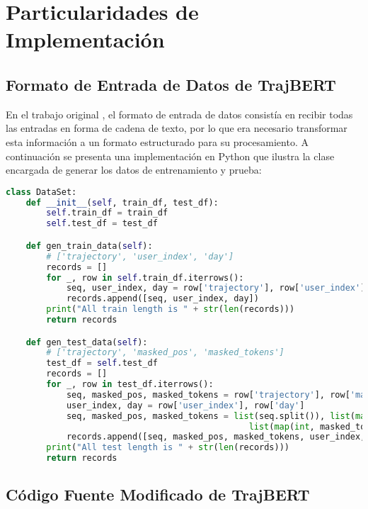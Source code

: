 \appendix

\chapter{Particularidades de Implementación}

\section{Formato de Entrada de Datos de TrajBERT}
\label{apx:trajbert_data_format}

En el trabajo original \cite{si2023trajbert}, el formato de entrada de datos consistía en recibir todas las entradas en forma de cadena de texto, por lo que era necesario transformar esta información a un formato estructurado para su procesamiento. A continuación se presenta una implementación en Python que ilustra la clase encargada de generar los datos de entrenamiento y prueba:

\begin{lstlisting}[language=Python, caption={Clase encargada de generar los datos de entrenamiento y prueba.}]
class DataSet:
    def __init__(self, train_df, test_df):
        self.train_df = train_df
        self.test_df = test_df

    def gen_train_data(self):
        # ['trajectory', 'user_index', 'day']
        records = []
        for _, row in self.train_df.iterrows():
            seq, user_index, day = row['trajectory'], row['user_index'], row['day']
            records.append([seq, user_index, day])
        print("All train length is " + str(len(records)))
        return records

    def gen_test_data(self):
        # ['trajectory', 'masked_pos', 'masked_tokens']
        test_df = self.test_df
        records = []
        for _, row in test_df.iterrows():
            seq, masked_pos, masked_tokens = row['trajectory'], row['masked_pos'], row['masked_tokens']
            user_index, day = row['user_index'], row['day']
            seq, masked_pos, masked_tokens = list(seq.split()), list(map(int, masked_pos.split())), \
                                                list(map(int, masked_tokens.split()))
            records.append([seq, masked_pos, masked_tokens, user_index, day])
        print("All test length is " + str(len(records)))
        return records
\end{lstlisting}


\section{Código Fuente Modificado de TrajBERT}
\label{apx:source_code_modified}

